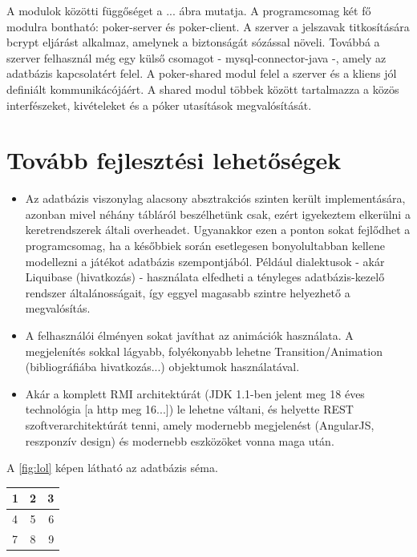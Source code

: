 A modulok közötti függőséget a ... ábra mutatja. A programcsomag két fő modulra bontható: poker-server és poker-client. A szerver a jelszavak titkosítására bcrypt eljárást alkalmaz, amelynek a biztonságát sózással növeli. Továbbá a szerver felhasznál még egy külső csomagot - mysql-connector-java -, amely az adatbázis kapcsolatért felel.
A poker-shared modul felel a szerver és a kliens jól definiált kommunikácójáért. A shared modul többek között tartalmazza a közös interfészeket, kivételeket és a póker utasítások megvalósítását.

\section{Tovább fejlesztési lehetőségek}
\begin{itemize}
\item Az adatbázis viszonylag alacsony absztrakciós szinten került implementására, azonban mivel néhány tábláról beszélhetünk csak, ezért igyekeztem elkerülni a keretrendszerek általi overheadet. Ugyanakkor ezen a ponton sokat fejlődhet a programcsomag, ha a későbbiek során esetlegesen bonyolultabban kellene modellezni a játékot adatbázis szempontjából. Például dialektusok - akár Liquibase (hivatkozás) - használata elfedheti a tényleges adatbázis-kezelő rendszer általánosságait, így eggyel magasabb szintre helyezhető a megvalósítás.
\item A felhasználói élményen sokat javíthat az animációk használata. A megjelenítés sokkal lágyabb, folyékonyabb lehetne Transition/Animation (bibliográfiába hivatkozás...) objektumok használatával.
\item Akár a komplett RMI architektúrát (JDK 1.1-ben jelent meg 18 éves technológia [a http meg 16...]) le lehetne váltani, és helyette REST szoftverarchitektúrát tenni, amely modernebb megjelenést (AngularJS, reszponzív design) és modernebb eszközöket vonna maga után.
\end{itemize}


A \ref{fig:lol} képen látható az adatbázis séma.

\begin{tabular}{| l | c | r |}
\hline
  1 & 2 & 3 \\ \hline
  4 & 5 & 6 \\ \hline
  7 & 8 & 9 \\ \hline
\end{tabular}

\clearpage
